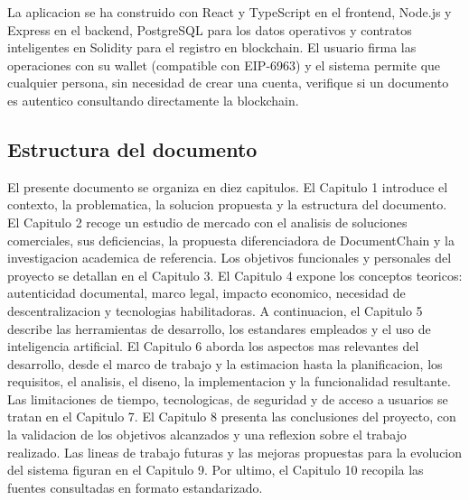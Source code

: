 \documentclass[11pt, a4paper]{article}
\begin{document}
La aplicacion se ha construido con React y TypeScript en el frontend, Node.js y Express en el backend, PostgreSQL para los datos operativos y contratos inteligentes en Solidity para el registro en blockchain. El usuario firma las operaciones con su wallet (compatible con EIP-6963) y el sistema permite que cualquier persona, sin necesidad de crear una cuenta, verifique si un documento es autentico consultando directamente la blockchain.

\subsection{Estructura del documento}

El presente documento se organiza en diez capitulos. El Capitulo 1 introduce el contexto, la problematica, la solucion propuesta y la estructura del documento. El Capitulo 2 recoge un estudio de mercado con el analisis de soluciones comerciales, sus deficiencias, la propuesta diferenciadora de DocumentChain y la investigacion academica de referencia. Los objetivos funcionales y personales del proyecto se detallan en el Capitulo 3. El Capitulo 4 expone los conceptos teoricos: autenticidad documental, marco legal, impacto economico, necesidad de descentralizacion y tecnologias habilitadoras. A continuacion, el Capitulo 5 describe las herramientas de desarrollo, los estandares empleados y el uso de inteligencia artificial. El Capitulo 6 aborda los aspectos mas relevantes del desarrollo, desde el marco de trabajo y la estimacion hasta la planificacion, los requisitos, el analisis, el diseno, la implementacion y la funcionalidad resultante. Las limitaciones de tiempo, tecnologicas, de seguridad y de acceso a usuarios se tratan en el Capitulo 7. El Capitulo 8 presenta las conclusiones del proyecto, con la validacion de los objetivos alcanzados y una reflexion sobre el trabajo realizado. Las lineas de trabajo futuras y las mejoras propuestas para la evolucion del sistema figuran en el Capitulo 9. Por ultimo, el Capitulo 10 recopila las fuentes consultadas en formato estandarizado.
\end{document}
